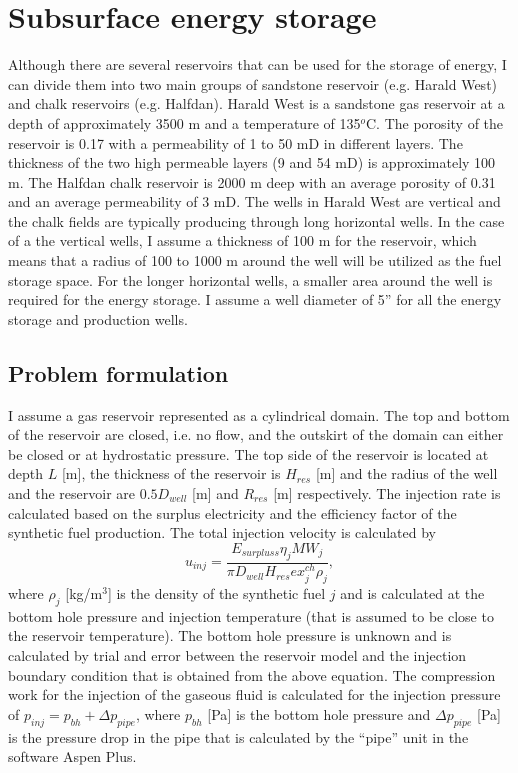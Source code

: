 \documentclass{ECOS_2021}
\begin{document}
\sffamily \section{Subsurface energy storage}
\normalsize
Although there are several reservoirs that can be used for the storage
of energy, I can divide them into two main groups of sandstone reservoir
(e.g. Harald West) and chalk reservoirs (e.g. Halfdan). Harald West
is a sandstone gas reservoir at a depth of approximately 3500 m and
a temperature of 135$^{o}$C. The porosity of the reservoir is 0.17
with a permeability of 1 to 50 mD in different layers. The thickness
of the two high permeable layers (9 and 54 mD) is approximately 100
m. The Halfdan chalk reservoir is 2000 m deep with an average porosity
of 0.31 and an average permeability of 3 mD. The wells in Harald West
are vertical and the chalk fields are typically producing through
long horizontal wells. In the case of a the vertical wells, I assume
a thickness of 100 m for the reservoir, which means that a radius
of 100 to 1000 m around the well will be utilized as the fuel storage
space. For the longer horizontal wells, a smaller area around the
well is required for the energy storage. I assume a well diameter
of 5'' for all the energy storage and production wells. 

\sffamily \subsection{Problem formulation}
\normalsize
I assume a gas reservoir represented
as a cylindrical domain. The top and bottom of the reservoir are closed,
i.e. no flow, and the outskirt of the domain can either be closed
or at hydrostatic pressure. The top side of the reservoir is located
at depth $L$ {[}m{]}, the thickness of the reservoir is $H_{res}$
{[}m{]} and the radius of the well and the reservoir are $0.5D_{well}$
{[}m{]} and $R_{res}$ {[}m{]} respectively. The injection rate is
calculated based on the surplus electricity and the efficiency factor
of the synthetic fuel production. The total injection
velocity is calculated by
\[
u_{inj}=\frac{E_{surpluss}\eta_{j}MW_{j}}{\pi D_{well}H_{res}ex_{j}^{ch}\rho_{j}},
\]
where $\rho_{j}$ {[}kg/m$^{3}${]} is the density of the synthetic
fuel $j$ and is calculated at the bottom hole pressure and injection
temperature (that is assumed to be close to the reservoir temperature).
The bottom hole pressure is unknown and is calculated by trial and
error between the reservoir model and the injection boundary condition
that is obtained from the above equation. The compression work
for the injection of the gaseous fluid is calculated for the injection
pressure of $p_{inj}=p_{bh}+\Delta p_{pipe}$, where $p_{bh}$ {[}Pa{]}
is the bottom hole pressure and $\Delta p_{pipe}$ {[}Pa{]} is the
pressure drop in the pipe that is calculated by the ``pipe'' unit
in the software Aspen Plus.
\end{document}
